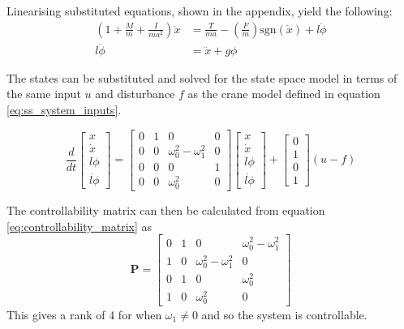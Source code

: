 \documentclass{article}
\begin{document}
Linearising substituted equations, shown in the appendix, yield the following:
\begin{align}
  \left( 1 + \frac{M}{m} + \frac{I}{ma^2} \right) \ddot{x} &= \frac{T}{ma} - \left(\frac{F}{m} \right)\text{sgn}(\dot{x}) + l \ddot{\phi} \label{eq:invp_motion_1} \\
  l \ddot{\phi} &= \ddot{x} + g\phi \label{eq:invp_motion_2}
\end{align}

The states can be substituted and solved for the state space model in terms of the same input $u$ and disturbance $f$ as the crane model defined in equation \ref{eq:ss_system_inputs}.

\begin{equation}
  \frac{d}{dt} 
  \begin{bmatrix}
     x \\ \dot{x} \\ l\phi \\ \dot{l\phi} \end{bmatrix} = \begin{bmatrix} 
      0 & 1 & 0 & 0 \\ 0 & 0 & \omega_0^2 - \omega_1^2 & 0 \\ 0 & 0 & 0 & 1 \\ 0 & 0 & \omega_0^2 & 0 \end{bmatrix} \begin{bmatrix} 
        x \\ \dot{x} \\ l\phi \\ \dot{l\phi} \end{bmatrix} + \begin{bmatrix} 
          0 \\ 1 \\ 0 \\ 1 \end{bmatrix} (u - f)
\end{equation}

The controllability matrix can then be calculated from equation \ref{eq:controllability_matrix} as
\begin{equation}
  \mathbf{P} = \left[\begin{matrix}0 & 1 & 0 & \omega_{0}^{2} - \omega_{1}^{2}\\1 & 0 & \omega_{0}^{2} - \omega_{1}^{2} & 0\\0 & 1 & 0 & \omega_{0}^{2}\\1 & 0 & \omega_{0}^{2} & 0\end{matrix}\right]
\end{equation}
This gives a rank of 4 for when $\omega_1 \neq 0$ and so the system is controllable.
\end{document}
